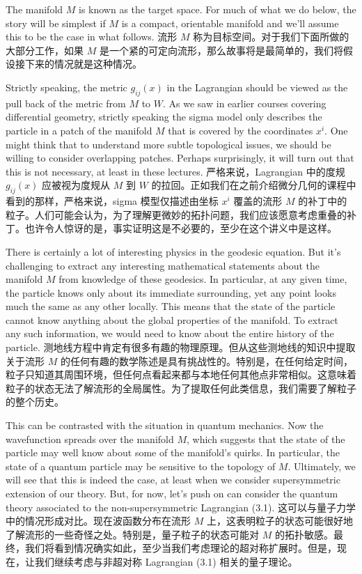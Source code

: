 \documentclass{article}
\begin{document}
\begin{paracol}{2}
The manifold $M$ is known as the target space. For much of what we do below, the story will be simplest if $M$ is a compact, orientable manifold and we’ll assume this to be the case in what follows.
\switchcolumn
流形 $M$ 称为目标空间。对于我们下面所做的大部分工作，如果 $M$ 是一个紧的可定向流形，那么故事将是最简单的，我们将假设接下来的情况就是这种情况。
\switchcolumn*

Strictly speaking, the metric $g_{ij}(x)$ in the Lagrangian should be viewed as the pull back of the metric from $M$ to $W$. As we saw in earlier courses covering differential geometry, strictly speaking the sigma model only describes the particle in a patch of the manifold $M$ that is covered by the coordinates $x^i$. One might think that to understand more subtle topological issues, we should be willing to consider overlapping patches. Perhaps surprisingly, it will turn out that this is not necessary, at least in these lectures.
\switchcolumn
严格来说，Lagrangian 中的度规 $g_{ij}(x)$ 应被视为度规从 $M$ 到 $W$ 的拉回。正如我们在之前介绍微分几何的课程中看到的那样，严格来说，sigma 模型仅描述由坐标 $x^i$ 覆盖的流形 $M$ 的补丁中的粒子。人们可能会认为，为了理解更微妙的拓扑问题，我们应该愿意考虑重叠的补丁。也许令人惊讶的是，事实证明这是不必要的，至少在这个讲义中是这样。
\switchcolumn*

There is certainly a lot of interesting physics in the geodesic equation. But it's challenging to extract any interesting mathematical statements about the manifold $M$ from knowledge of these geodesics. In particular, at any given time, the particle knows only about its immediate surrounding, yet any point looks much the same as any other locally. This means that the state of the particle cannot know anything about the global properties of the manifold. To extract any such information, we would need to know about the entire history of the particle.
\switchcolumn
测地线方程中肯定有很多有趣的物理原理。但从这些测地线的知识中提取关于流形 $M$ 的任何有趣的数学陈述是具有挑战性的。特别是，在任何给定时间，粒子只知道其周围环境，但任何点看起来都与本地任何其他点非常相似。这意味着粒子的状态无法了解流形的全局属性。为了提取任何此类信息，我们需要了解粒子的整个历史。
\switchcolumn*

This can be contrasted with the situation in quantum mechanics. Now the wavefunction spreads over the manifold $M$, which suggests that the state of the particle may well know about some of the manifold’s quirks. In particular, the state of a quantum particle may be sensitive to the topology of $M$. Ultimately, we will see that this is indeed the case, at least when we consider supersymmetric extension of our theory. But, for now, let’s push on can consider the quantum theory associated to the non-supersymmetric Lagrangian (3.1).
\switchcolumn
这可以与量子力学中的情况形成对比。现在波函数分布在流形 $M$ 上，这表明粒子的状态可能很好地了解流形的一些奇怪之处。特别是，量子粒子的状态可能对 $M$ 的拓扑敏感。最终，我们将看到情况确实如此，至少当我们考虑理论的超对称扩展时。但是，现在，让我们继续考虑与非超对称 Lagrangian (3.1) 相关的量子理论。
\switchcolumn*


\end{paracol}
\end{document}
